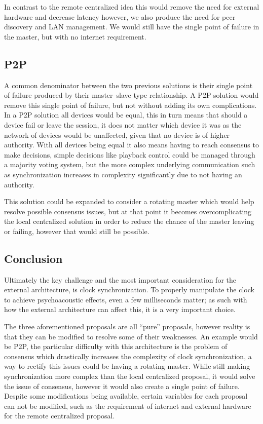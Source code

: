 In contrast to the remote centralized idea this would remove the need for external hardware and decrease latency however, we also produce the need for peer discovery and LAN management.
We would still have the single point of failure in the master, but with no internet requirement.

\subsection{\acl{P2P}}
A common denominator between the two previous solutions is their single point of failure produced by their master--slave type relationship.
A \ac{P2P} solution would remove this single point of failure, but not without adding its own complications.
In a \ac{P2P} solution all devices would be equal, this in turn means that should a device fail or leave the session, it does not matter which device it was as the network of devices would be unaffected, given that no device is of higher authority.
With all devices being equal it also means having to reach consensus to make decisions, simple decisions like playback control could be managed through a majority voting system, but the more complex underlying communication such as synchronization increases in complexity significantly due to not having an authority.

This solution could be expanded to consider a rotating master which would help resolve possible consensus issues, but at that point it becomes overcomplicating the local centralized solution in order to reduce the chance of the master leaving or failing, however that would still be possible.

\subsection{Conclusion}
Ultimately the key challenge and the most important consideration for the external architecture, is clock synchronization.
To properly manipulate the clock to achieve psychoacoustic effects, even a few milliseconds matter; as such with how the external architecture can affect this, it is a very important choice.

The three aforementioned proposals are all ``pure'' proposals, however reality is that they can be modified to resolve some of their weaknesses.
An example would be \ac{P2P}, the particular difficulty with this architecture is the problem of consensus which drastically increases the complexity of clock synchronization, a way to rectify this issues could be having a rotating master.
While still making synchronization more complex than the local centralized proposal, it would solve the issue of consensus, however it would also create a single point of failure.
Despite some modifications being available, certain variables for each proposal can not be modified, such as the requirement of internet and external hardware for the remote centralized proposal.

